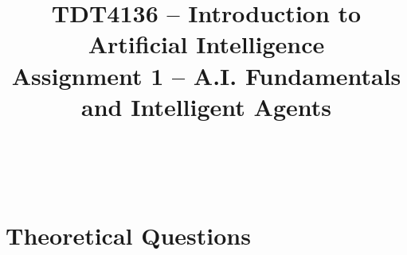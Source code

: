 

\title{
    \vspace{-1in} 
    \Large \bfseries \strut TDT4136 -- Introduction to Artificial Intelligence\\Assignment 1 -- A.I. Fundamentals and Intelligent Agents\strut \\
}


\maketitle

\section*{Theoretical Questions}

